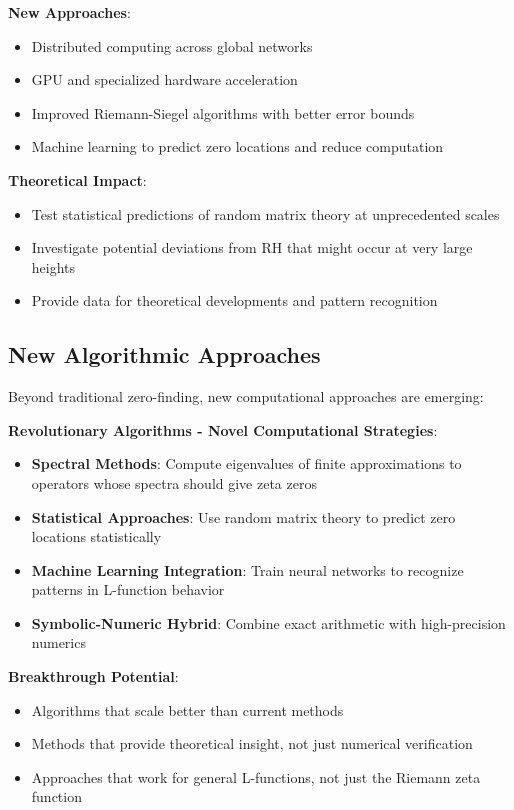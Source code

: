 \textbf{New Approaches}:
\begin{itemize}
\item Distributed computing across global networks
\item GPU and specialized hardware acceleration
\item Improved Riemann-Siegel algorithms with better error bounds
\item Machine learning to predict zero locations and reduce computation
\end{itemize}

\textbf{Theoretical Impact}:
\begin{itemize}
\item Test statistical predictions of random matrix theory at unprecedented scales
\item Investigate potential deviations from RH that might occur at very large heights
\item Provide data for theoretical developments and pattern recognition
\end{itemize}

\subsection{New Algorithmic Approaches}
\label{subsec:new_algorithms}

Beyond traditional zero-finding, new computational approaches are emerging:

\noindent\textbf{Revolutionary Algorithms - Novel Computational Strategies}:
\begin{itemize}
\item \textbf{Spectral Methods}: Compute eigenvalues of finite approximations to operators whose spectra should give zeta zeros
\item \textbf{Statistical Approaches}: Use random matrix theory to predict zero locations statistically
\item \textbf{Machine Learning Integration}: Train neural networks to recognize patterns in L-function behavior
\item \textbf{Symbolic-Numeric Hybrid}: Combine exact arithmetic with high-precision numerics
\end{itemize}

\textbf{Breakthrough Potential}:
\begin{itemize}
\item Algorithms that scale better than current methods
\item Methods that provide theoretical insight, not just numerical verification
\item Approaches that work for general L-functions, not just the Riemann zeta function
\end{itemize}

